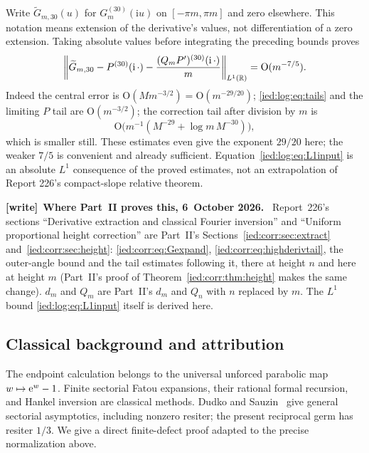\documentclass[11pt,letterpaper]{article}
\theoremstyle{remark}\newtheorem{remark}[theorem]{Remark}
\newcommand{\ii}{\mathrm i}\newcommand{\dd}{\,\mathrm d}
\newcommand{\Oh}{\mathrm O}\newcommand{\supp}{\operatorname{supp}}
\newenvironment{writenote}[1][]{\par\smallskip\begingroup\small
 \noindent\textbf{[write]}\if\relax\detokenize{#1}\relax\else~\textbf{#1.}\fi\ }%
 {\par\endgroup\smallskip}
\begin{document}
Write $\widetilde G_{m,30}(u)$ for $G_m^{(30)}(\ii u)$ on
$[-\pi m,\pi m]$ and zero elsewhere. This notation means extension of the derivative's values, not differentiation of a zero extension. Taking absolute values before integrating the preceding bounds proves
\begin{equation}\label{ied:log:eq:L1input}
 \left\|\widetilde G_{m,30}
 -P^{(30)}(\ii\,\cdot)
 -\frac{(Q_mP')^{(30)}(\ii\,\cdot)}m\right\|_{L^1(\R)}
       =\Oh(m^{-7/5}).
\end{equation}
Indeed the central error is $\Oh(Mm^{-3/2})=\Oh(m^{-29/20})$;
\eqref{ied:log:eq:tails} and the limiting $P$ tail are $\Oh(m^{-3/2})$; the correction tail after division by $m$ is
\[
 \Oh\bigl(m^{-1}(M^{-29}+\log m\,M^{-30})\bigr),
\]
which is smaller still. These estimates even give the exponent $29/20$ here; the weaker $7/5$ is convenient and already sufficient. Equation~\eqref{ied:log:eq:L1input} is an absolute $L^1$ consequence of the proved estimates, not an extrapolation of Report 226's compact-slope relative theorem.

\begin{writenote}[Where Part~II proves this, 6~October 2026]
Report~226's sections ``Derivative extraction and classical Fourier inversion'' and ``Uniform proportional height correction'' are Part~II's Sections~\ref{ied:corr:sec:extract} and~\ref{ied:corr:sec:height}: \eqref{ied:corr:eq:Gexpand}, \eqref{ied:corr:eq:highderivtail}, the outer-angle bound and the tail estimates following it, there at height $n$ and here at height $m$ (Part~II's proof of Theorem~\ref{ied:corr:thm:height} makes the same change). $d_m$ and $Q_m$ are Part~II's $d_m$ and $Q_n$ with $n$ replaced by $m$. The $L^1$ bound \eqref{ied:log:eq:L1input} itself is derived here.
\end{writenote}

\subsection{Classical background and attribution}\label{ied:log:sub:classical}
The endpoint calculation belongs to the universal unforced parabolic map $w\mapsto\mathrm e^w-1$. Finite sectorial Fatou expansions, their rational formal recursion, and Hankel inversion are classical methods. Dudko and Sauzin~\cite{DS} give general sectorial asymptotics, including nonzero resiter; the present reciprocal germ has resiter $1/3$. We give a direct finite-defect proof adapted to the precise normalization above.
\end{document}
